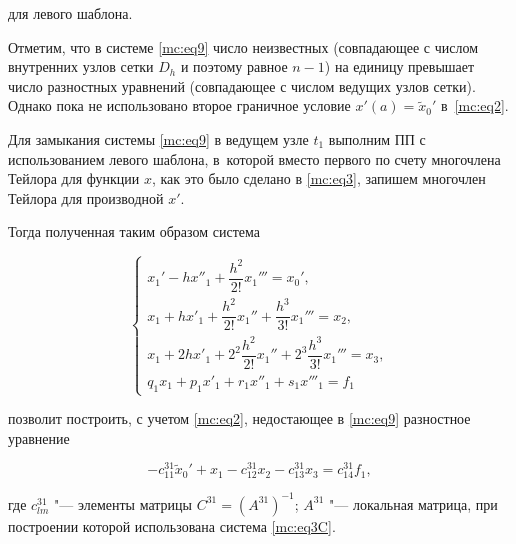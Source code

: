 для левого шаблона.



Отметим, что в системе \eqref{mc:eq9} число неизвестных (совпадающее с числом внутренних узлов сетки $  D_h$ и поэтому равное $n-1$) на единицу превышает число разностных уравнений (совпадающее с числом ведущих узлов сетки). Однако пока не использовано второе граничное условие $x'(a)=\widetilde{x}_0'$ в~\eqref{mc:eq2}.



Для замыкания системы \eqref{mc:eq9} в ведущем узле $  t_1$ выполним ПП с использованием левого шаблона, в~которой вместо первого по счету многочлена Тейлора для функции $  x$, как это было сделано в \eqref{mc:eq3}, запишем многочлен Тейлора для производной $  x'$. %

Тогда полученная таким образом система

\begin{equation}

\label{mc:eq3C}

\begin{cases}

  x_1'-h x''_1+\dfrac{h^{2}}{2!} x_{1}'''=x_{0}',

\\[1mm]

  x_1+h x'_1+\dfrac{h^{2}}{2!} x_{1}''+\dfrac{h^{3}}{3!} x_{1}'''=x_{2},

\\[1mm]

  x_1+2 h x'_1+2^2 \dfrac{h^{2}}{2!} x_{1}''+2^3 \dfrac{h^{3}}{3!} x_{1}'''=x_{3},

\\[1mm]

  q_1 x_1+p_1 x'_1+r_1 x''_1+s_1 x'''_1=f_1

\end{cases}

\end{equation}

позволит построить, с учетом \eqref{mc:eq2}, недостающее в \eqref{mc:eq9} разностное уравнение

\begin{equation}


  -c_{11}^{31} \widetilde{x}_0'+x_1-c_{12}^{31} x_{2}-c_{13}^{31} x_{3}=c_{14}^{31} f_{1},

\end{equation}

где $  c_{lm}^{31}$ "--- элементы  матрицы $  C^{31}=(A^{31})^{-1}$;  $  A^{31}$ "--- локальная матрица, при построении которой использована система \eqref{mc:eq3C}.



